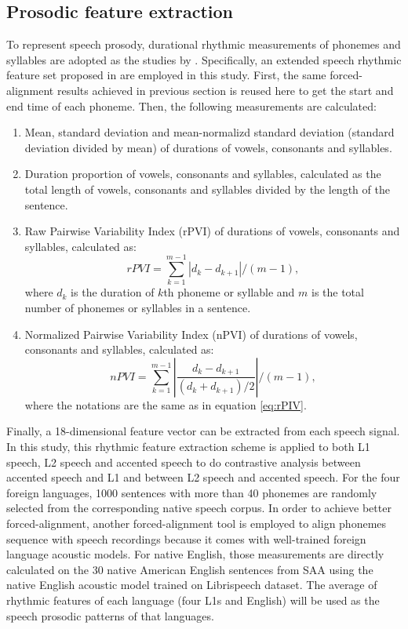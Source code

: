 \subsection{Prosodic feature extraction}
\label{sec:supraseg}

To represent speech prosody, durational rhythmic measurements of phonemes and syllables are adopted as the studies by \cite{ramus1999correlates,grabe2002durational}. Specifically, an extended speech rhythmic feature set proposed in \citep{lai2013applying} are employed in this study. First, the same forced-alignment results achieved in previous section is reused here to get the start and end time of each phoneme. Then, the following measurements are calculated:
\begin{enumerate}
\item Mean, standard deviation and mean-normalizd standard deviation (standard deviation divided by mean) of durations of vowels, consonants and syllables.
\item Duration proportion of vowels, consonants and syllables, calculated as the total length of vowels, consonants and syllables divided by the length of the sentence.
\item Raw Pairwise Variability Index (rPVI) of durations of vowels, consonants and syllables, calculated as:
    \begin{equation}
    \label{eq:rPIV}
    rPVI= \sum_{k=1}^{m-1} |d_k-d_{k+1}|/(m-1),
    \end{equation}
    where $d_k$ is the duration of $k$th phoneme or syllable and $m$ is the total number of phonemes or syllables in a sentence.
\item Normalized Pairwise Variability Index (nPVI) of durations of vowels, consonants and syllables, calculated as:
    \begin{equation}
    \label{eq:nPIV}
    nPVI= \sum_{k=1}^{m-1} |\frac{d_k-d_{k+1}}{(d_k + d_{k+1})/2}|/(m-1),
    \end{equation}
    where the notations are the same as in equation \ref{eq:rPIV}.
\end{enumerate}

Finally, a 18-dimensional feature vector can be extracted from each speech signal. In this study, this rhythmic feature extraction scheme is applied to both L1 speech, L2 speech and accented speech to do contrastive analysis between accented speech and L1 and between L2 speech and accented speech. For the four foreign languages, 1000 sentences with more than 40 phonemes are randomly selected from the corresponding native speech corpus. In order to achieve better forced-alignment, another forced-alignment tool \citep{mcauliffe2017montreal} is employed to align phonemes sequence with speech recordings because it comes with well-trained foreign language acoustic models. For native English, those measurements are directly calculated on the 30 native American English sentences from SAA using the native English acoustic model trained on Librispeech dataset. The average of rhythmic features of each language (four L1s and English) will be used as the speech prosodic patterns of that languages. 

